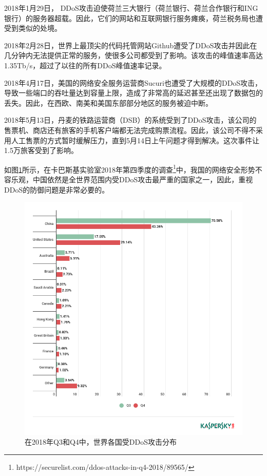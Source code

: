 2018年1月29日， DDoS攻击迫使荷兰三大银行（荷兰银行、荷兰合作银行和ING银行）的服务器超载。因此，它们的网站和互联网银行服务瘫痪，荷兰税务局也遭受到类似的处境。

2018年2月28日，世界上最顶尖的代码托管网站Github遭受了DDoS攻击并因此在几分钟内无法提供正常的服务，使很多公司都受到了影响。该攻击的峰值速率高达1.35Tb/s，超过了以往的所有DDoS峰值速率记录。

2018年4月17日，美国的网络安全服务运营商Sucuri也遭受了大规模的DDoS攻击，导致一些端口的吞吐量达到容量上限，造成了非常高的延迟甚至还出现了数据包的丢失。因此，在西欧、南美和美国东部部分地区的服务被迫中断。

2018年5月13日，丹麦的铁路运营商（DSB）的系统受到了DDoS攻击，该公司的售票机、商店还有旅客的手机客户端都无法完成购票流程。因此，该公司不得不采用人工售票的方式暂时缓解压力，直到5月14日上午问题才得到解决。这次事件让1.5万旅客受到了影响。

如图\ref{fig:ddos_countries}所示，在卡巴斯基实验室2018年第四季度的调查\footnote{https://securelist.com/ddos-attacks-in-q4-2018/89565/}中，我国的网络安全形势不容乐观，中国依然是全世界范围内受DDoS攻击最严重的国家之一，因此，重视DDoS的防御问题是非常必要的。

\begin{figure}
    \centering
    \includegraphics[scale=0.5]{figures/en-ddos-by-countries.png}
    \caption{在2018年Q3和Q4中，世界各国受DDoS攻击分布}
    \label{fig:ddos_countries}
\end{figure}


